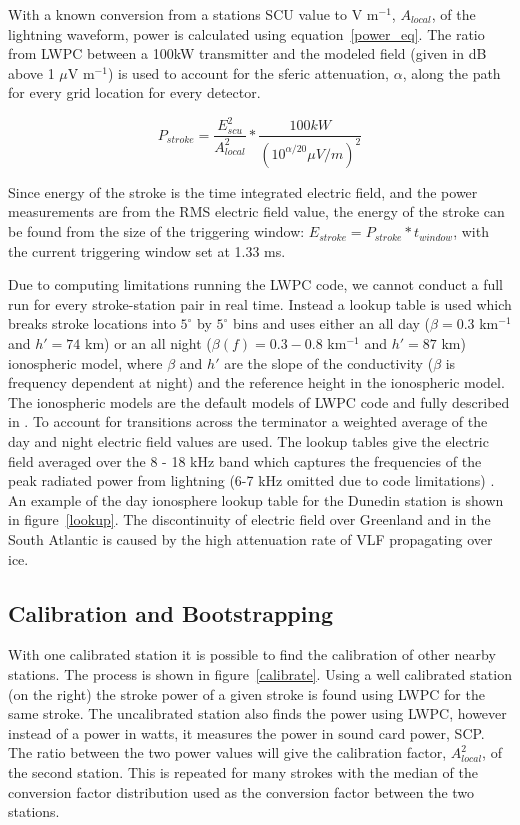 \documentclass[12pt]{article}
\begin{document}
With a known conversion from a stations SCU value to V m$^{-1}$, $A_{local}$, of the lightning waveform, power is calculated using equation~\ref{power_eq}. The ratio from LWPC between a 100kW transmitter and the modeled field (given in dB above 1 $\mu$V m$^{-1}$) is used to account for the sferic attenuation, $\alpha$, along the path for every grid location for every detector.

\begin{equation}
P_{stroke}=\frac{E_{scu}^2}{A_{local}^2} * \frac{100kW}{(10^{\alpha/20}\mu V/m)^2}
\label{power_eq}
\end{equation}

Since energy of the stroke is the time integrated electric field, and the power measurements are from the RMS electric field value, the energy of the stroke can be found from the size of the triggering window: $E_{stroke}=P_{stroke} * t_{window}$, with the current triggering window set at 1.33 ms.

Due to computing limitations running the LWPC code, we cannot conduct a full run for every stroke-station pair in real time. Instead a lookup table is used which breaks stroke locations into $5^{\circ}$ by $5^{\circ}$ bins and uses either an all day ($\beta=0.3$ km$^{-1}$ and $h'=74$ km) or an all night ($\beta(f)=0.3-0.8$ km$^{-1}$ and $h'=87$ km) ionospheric model, where $\beta$ and $h'$ are the slope of the conductivity ($\beta$ is frequency dependent at night) and the reference height in the ionospheric model. The ionospheric models are the default models of LWPC code and fully described in \citet{Ferguson1998}.  To account for transitions across the terminator a weighted average of the day and night electric field values are used. The lookup tables give the electric field averaged over the 8 - 18 kHz band which captures the frequencies of the peak radiated power from lightning (6-7 kHz omitted due to code limitations) \citep{Volland1995}. An example of the day ionosphere lookup table for the Dunedin station is shown in figure~\ref{lookup}. The discontinuity of electric field over Greenland and in the South Atlantic is caused by the high attenuation rate of VLF propagating over ice.

\subsection{Calibration and Bootstrapping}

With one calibrated station it is possible to find the calibration of other nearby stations. The process is shown in figure~\ref{calibrate}. Using a well calibrated station (on the right) the stroke power of a given stroke is found using LWPC for the same stroke. The uncalibrated station also finds the power using LWPC, however instead of a power in watts, it measures the power in sound card power, SCP. The ratio between the two power values will give the calibration factor, $A_{local}^2$, of the second station. This is repeated for many strokes with the median of the conversion factor distribution used as the conversion factor between the two stations.
\end{document}
